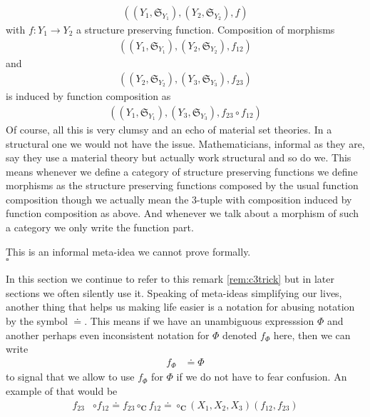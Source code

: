 \begin{rem}[(C3) Trick]
\begin{align*}
  \left(
    (Y_{1},\mathfrak{S}_{Y_{1}}),
    (Y_{2},\mathfrak{S}_{Y_{2}}),
    f
  \right)
\end{align*}
with $f \colon Y_{1} \rightarrow Y_{2}$ a structure preserving function. Composition of morphisms
\begin{align*}
  \left(
    (Y_{1},\mathfrak{S}_{Y_{1}}),
    (Y_{2},\mathfrak{S}_{Y_{2}}),
    f_{12}
  \right)
\end{align*}
and
\begin{align*}
  \left(
    (Y_{2},\mathfrak{S}_{Y_{2}}),
    (Y_{3},\mathfrak{S}_{Y_{3}}),
    f_{23}
  \right)
\end{align*}
is induced by function composition as
\begin{align*}
  \left(
    (Y_{1},\mathfrak{S}_{Y_{1}}),
    (Y_{3},\mathfrak{S}_{Y_{3}}),
    f_{23}
    \circ
    f_{12}
  \right)
\end{align*}
Of course, all this is very clumsy and an echo of material set theories. In a structural one we would not have the issue. Mathematicians, informal as they are, say they use a material theory but actually work structural and so do we. This means whenever we define a category of structure preserving functions we define morphisms as the structure preserving functions composed by the usual function composition though we actually mean the $3$-tuple with composition induced by function composition as above. And whenever we talk about a morphism of such a category we only write the function part.
\end{rem}
\begin{prf}
This is an informal meta-idea we cannot prove formally.
\\
\phantom{proven}
\hfill
$\square$
\end{prf}
In this section we continue to refer to this remark \ref{rem:c3trick} but in later sections we often silently use it. Speaking of meta-ideas simplifying our lives, another thing that helps us making life easier is a notation for {\glqq}abusing notation{\grqq} by the symbol $\doteq$. This means if we have an unambiguous expresssion $\Phi$ and another perhaps even inconsistent notation for $\Phi$ denoted $f_{\Phi}$ here, then we can write
\begin{align*}
  f_{\Phi}
  &\doteq
  \Phi
\end{align*}
to signal that we allow to use $f_{\Phi}$ for $\Phi$ if we do not have to fear confusion. An example of that would be
\begin{align*}
  f_{23}
  &\circ
  f_{12}
  \doteq
  f_{23}
  \circ_{\mathbf{C}}
  f_{12}
  \doteq
  \circ_{\mathbf{C}}(X_{1},X_{2},X_{3})(f_{12},f_{23})
\end{align*}
